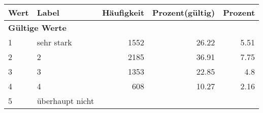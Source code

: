      \begin{longtable}{lXrrr}
     \toprule
     \textbf{Wert} & \textbf{Label} & \textbf{Häufigkeit} & \textbf{Prozent(gültig)} & \textbf{Prozent} \\
     \endhead
     \midrule
     \multicolumn{5}{l}{\textbf{Gültige Werte}}\\

     1 &
     \multicolumn{1}{X}{ sehr stark   } &


       \num{1552} &
       \num[round-mode=places,round-precision=2]{26.22} &
         \num[round-mode=places,round-precision=2]{5.51} \\

     2 &
     \multicolumn{1}{X}{ 2   } &


       \num{2185} &
       \num[round-mode=places,round-precision=2]{36.91} &
         \num[round-mode=places,round-precision=2]{7.75} \\

     3 &
     \multicolumn{1}{X}{ 3   } &


       \num{1353} &
       \num[round-mode=places,round-precision=2]{22.85} &
         \num[round-mode=places,round-precision=2]{4.8} \\

     4 &
     \multicolumn{1}{X}{ 4   } &


       \num{608} &
       \num[round-mode=places,round-precision=2]{10.27} &
         \num[round-mode=places,round-precision=2]{2.16} \\

     5 &
     \multicolumn{1}{X}{ überhaupt nicht   } &



\end{longtable}
